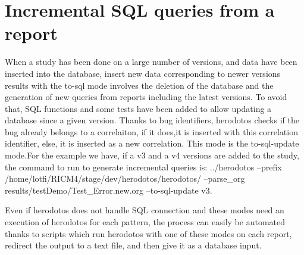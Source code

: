 \section{Incremental SQL queries from a report}
\label{sec:sql-queries}
When a study has been done on a large number of versions, and data have been inserted into the database, insert new data
corresponding to newer versions results with the to-sql mode involves the deletion of the database and the generation
of new queries from reports including the latest versions. To avoid that, SQL functions and some tests have been added
to allow updating a database since a given version. Thanks to bug identifiers, herodotos checks if the bug already
belongs to a correlaiton, if it does,it is inserted with this correlation identifier, 
else, it is inserted as a new correlation.
This mode is the to-sql-update mode.For the example we have, if a v3 and a v4  
versions are added to the study, the command to run to generate incremental queries is:
../herodotos --prefix /home/lotfi/RICM4/stage/dev/herodotos/herodotos/ --parse\_org results/testDemo/Test\_Error.new.org --to-sql-update v3.


Even if herodotos does not handle SQL connection and these modes need an execution of herodotos for each pattern,
the process can easily be automated thanks to scripts which run herodotos with one of these modes on each
report, redirect the output to a text file, and then give it as a database input.